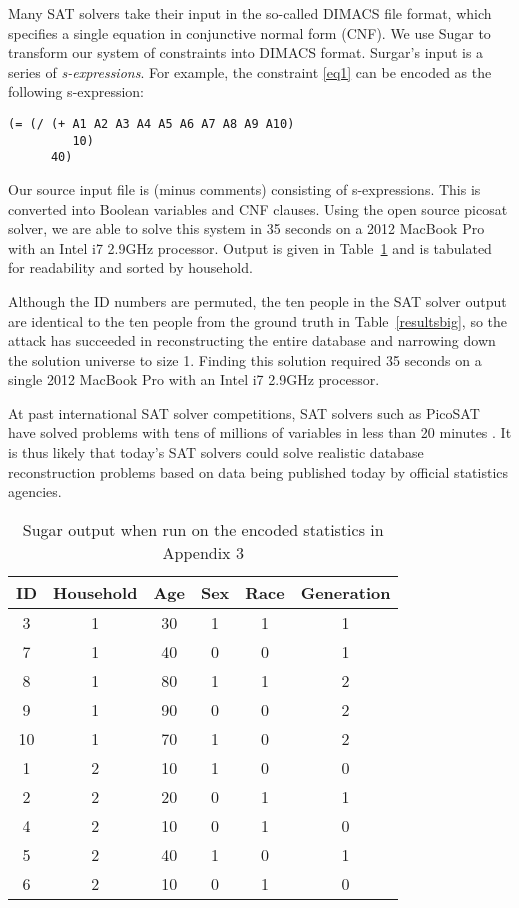 \documentclass[runningheads]{llncs}
\begin{document}
Many SAT solvers take their input in the so-called DIMACS file format,
which specifies a single equation in conjunctive normal form (CNF). We use
Sugar\cite{sugar} to transform our system of constraints into DIMACS
format. Surgar's input is a series of
\textit{s-expressions}\cite{McCarthy:1960:RFS:367177.367199}. For
example, the constraint \ref{eq1} can be encoded as the following
s-expression:
\begin{verbatim}
(= (/ (+ A1 A2 A3 A4 A5 A6 A7 A8 A9 A10) 
         10) 
      40)
\end{verbatim}

Our source input file is \NumConstraintLines{} (minus comments)
consisting of \NumSExpressions s-expressions. This is converted into
\NumVariables Boolean variables and \NumClauses CNF clauses. Using the
open source picosat solver\cite{Biere_picosatessentials}, we are able
to solve this system in 35 seconds on a 2012 MacBook Pro with an Intel
i7 2.9GHz processor. Output is given in Table~\ref{sugarbig} and is
tabulated for readability and sorted by household. 

Although the ID numbers are permuted, the ten people in the SAT
solver output are identical to the ten people from the ground truth in
Table~\ref{resultsbig}, so the attack has succeeded in reconstructing
the entire database and narrowing down the solution universe to size
1. Finding this solution required 35 seconds on a single 2012 MacBook
Pro with an Intel i7 2.9GHz processor. 

At past international SAT
solver competitions, SAT solvers such as PicoSAT have solved problems
with tens of millions of variables in less than 20 minutes
\cite{satcomp}. It is thus likely that today's SAT solvers could solve
realistic database reconstruction problems based on data being
published today by official statistics agencies.


\begin{table}
\begin{tabular}{c|c|c|c|c|c}
ID & Household & Age & Sex & Race & Generation \\
\hline
 3 & 1 & 30 & 1 & 1 & 1  \\
 7 & 1 & 40 & 0 & 0 & 1  \\
 8 & 1 & 80 & 1 & 1 & 2  \\
 9 & 1 & 90 & 0 & 0 & 2 \\
10 & 1 & 70 & 1 & 0 & 2 \\
 1 & 2 & 10 & 1 & 0 & 0  \\
 2 & 2 & 20 & 0 & 1 & 1  \\
 4 & 2 & 10 & 0 & 1 & 0  \\
 5 & 2 & 40 & 1 & 0 & 1  \\
 6 & 2 & 10 & 0 & 1 & 0  \\
\hline
\end{tabular}
\caption{Sugar output when run on the encoded statistics in Appendix 3}\label{sugarbig}
\end{table}
\end{document}
